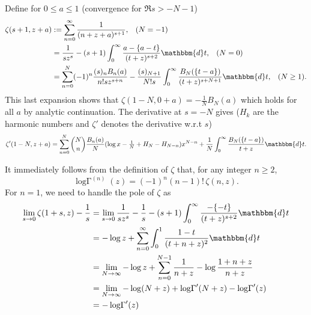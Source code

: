 \documentclass[12pt]{article}
\newcommand{\logG} {\operatorname {log \Gamma}}
\newcommand{\dd}[0] {\mathbbm{d}}
\numberwithin{equation}{section}
\begin{document}
Define for $0 \le a \le 1$ (convergence for $\Re s > -N-1$)
\begin{equation}
\label{equ_hurwitz_asymp}
\begin{alignedat}{6}
\zeta(s+1,z+a) &:= \sum_{n=0}^{\infty}\frac{1}{(n+z+a)^{s+1}} \text{,} \quad (N = -1) \\
&= \frac{1}{s z^s}-(s+1)\int_0^{\infty} \frac{a-\{a-t\}}{(t+z)^{s+2}} \dd t \text{,} \quad (N = 0) \\
&= \sum_{n=0}^{N} (-1)^n \frac{(s)_n B_n(a)}{n! s z^{s+n}}- \frac{(s)_{N+1}}{N! s} \int_{0}^{\infty}\frac{B_N(\{t-a\})}{(t+z)^{s+N+1}} \dd t\text{,} \quad (N \ge 1)\text{.}
\end{alignedat}
\end{equation}
This last expansion shows that $\zeta(1-N,0+a) = -\tfrac{1}{N} B_N(a)$ which holds for all $a$ by analytic continuation. The derivative at $s=-N$ gives ($H_k$ are the harmonic numbers and $\zeta'$ denotes the derivative w.r.t $s$)
\begin{equation}
\label{equ_zeta_prime_asymp}
\zeta'(1-N,z+a) = \sum_{n=0}^{N} \binom{N}{n} \frac{B_n(a)}{N} (\log x - \tfrac{1}{N} + H_{N}-H_{N-n}) x^{N-n} + \frac{1}{N} \int_{0}^{\infty}\frac{B_N(\{t-a\})}{t+z} \dd t\text{.}
\end{equation}

It immediately follows from the definition of $\zeta$ that, for any integer $n \ge 2$,
\begin{equation*}
\logG^{(n)}(z) = (-1)^n (n-1)! \,  \zeta(n,z)\text{.}
\end{equation*}
For $n=1$, we need to handle the pole of $\zeta$ as
\begin{align*}
\lim_{s \to 0} \zeta(1+s,z)-\frac{1}{s} &= \lim_{s \to 0}\frac{1}{s z^s}-\frac{1}{s} -(s+1) \int_0^{\infty} \frac{-\{-t\}}{(t+z)^{s+2}} \dd t\\
&= -\log z + \sum_{n=0}^{\infty} \int_0^1 \frac{1-t}{(t+n+z)^2}\dd t\\
&= \lim_{N\to\infty} -\log z + \sum_{n=0}^{N-1}\frac{1}{n+z} - \log \frac{1+n+z}{n+z}\\
&= \lim_{N\to\infty} -\log(N+z) + \logG'(N+z)-\logG'(z)\\
& = -\logG'(z)
\end{align*}
\end{document}
